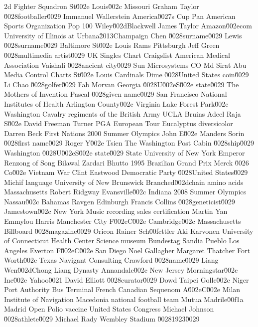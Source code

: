 2d Fighter Squadron  St\u002e Louis\u002c Missouri  Graham Taylor \u0028footballer\u0029  
Immanuel Wallerstein  America\u0027s Cup  Pan American Sports Organization  
Pop 100  Wiley\u002dBlackwell  James Taylor  
Amazon\u002ecom  University of Illinois at Urbana\u2013Champaign  Chen \u0028surname\u0029  
Lewis \u0028surname\u0029  Baltimore  St\u002e Louis Rams  
Pittsburgh  Jeff Green \u0028multimedia artist\u0029  UK Singles Chart  
Craigslist  American Medical Association  Vaishali \u0028ancient city\u0029  
Sun Microsystems  CO  Md Sirat Abu  
Media Control Charts  St\u002e Louis Cardinals  Dime \u0028United States coin\u0029  
Li Chao \u0028golfer\u0029  Fab Morvan  Georgia \u0028U\u002eS\u002e state\u0029  
The Mothers of Invention  Pascal \u0028given name\u0029  San Francisco  
National Institutes of Health  Arlington County\u002c Virginia  Lake Forest Park\u002c Washington  
Cavalry regiments of the British Army  UCLA Bruins  Adeel Raja  
S\u002e David Freeman  Turner  PGA European Tour  
Eucalyptus diversicolor  Darren Beck  First Nations  
2000 Summer Olympics  John E\u002e Manders  Sorin \u0028first name\u0029  
Roger Y\u002e Tsien  The Washington Post  Cabin \u0028ship\u0029  
Washington \u0028U\u002eS\u002e state\u0029  State University of New York  Emperor Renzong of Song  
Bilawal Zardari Bhutto  1995 Brazilian Grand Prix  Merck \u0026 Co\u002e  
Vietnam War  Clint Eastwood  Democratic Party \u0028United States\u0029  
Michif language  University of New Brunswick  Branched\u002dchain amino acids  
Massachusetts  Robert Ridgway  Evansville\u002c Indiana  
2008 Summer Olympics  Nassau\u002c Bahamas  Ravgen  
Edinburgh  Francis Collins \u0028geneticist\u0029  Jamestown\u002c New York  
Music recording sales certification  Martin Yan  Emmylou Harris  
Manchester City F\u002eC\u002e  Cambridge\u002c Massachusetts  Billboard \u0028magazine\u0029  
Oricon  Rainer Sch\u00fcttler  Aki Karvonen  
University of Connecticut Health Center  Science museum  Bundestag  
Sandia Pueblo  Los Angeles  Everton F\u002eC\u002e  
San Diego  Noel Gallagher  Margaret Thatcher  
Fort Worth\u002c Texas  Navigant Consulting  Crawford \u0028name\u0029  
Liang Wen\u002dChong  Liang Dynasty  Annandale\u002c New Jersey  
Morningstar\u002c Inc\u002e  Yahoo\u0021  David Elliott \u0028curator\u0029  
Dowd  Taipei  Golle\u002c Niger  
Port Authority Bus Terminal  French Canadian  Sequenom  
A\u002eC\u002e Milan  Institute of Navigation  Macedonia national football team  
Mutua Madrile\u00f1a Madrid Open  Polio vaccine  United States Congress  
Michael Johnson \u0028athlete\u0029  Michael Rady  Wembley Stadium \u00281923\u0029  
